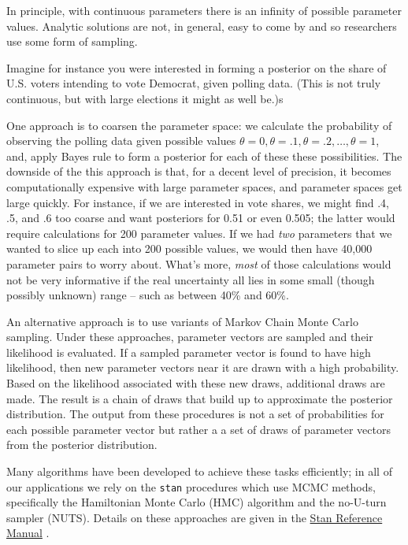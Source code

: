 \documentclass[
  12pt,
]{book}
\begin{document}
In principle, with continuous parameters there is an infinity of possible parameter values. Analytic solutions are not, in general, easy to come by and so researchers use some form of sampling.

Imagine for instance you were interested in forming a posterior on the share of U.S. voters intending to vote Democrat, given polling data. (This is not truly continuous, but with large elections it might as well be.)s

One approach is to coarsen the parameter space: we calculate the probability of observing the polling data given possible values \(\theta = 0, \theta = .1, \theta = .2, \dots, \theta = 1\), and, apply Bayes rule to form a posterior for each of these these possibilities. The downside of the this approach is that, for a decent level of precision, it becomes computationally expensive with large parameter spaces, and parameter spaces get large quickly. For instance, if we are interested in vote shares, we might find .4, .5, and .6 too coarse and want posteriors for 0.51 or even 0.505; the latter would require calculations for 200 parameter values. If we had \emph{two} parameters that we wanted to slice up each into 200 possible values, we would then have 40,000 parameter pairs to worry about. What's more, \emph{most} of those calculations would not be very informative if the real uncertainty all lies in some small (though possibly unknown) range -- such as between 40\% and 60\%.

An alternative approach is to use variants of Markov Chain Monte Carlo sampling. Under these approaches, parameter vectors are sampled and their likelihood is evaluated. If a sampled parameter vector is found to have high likelihood, then new parameter vectors near it are drawn with a high probability. Based on the likelihood associated with these new draws, additional draws are made. The result is a chain of draws that build up to approximate the posterior distribution. The output from these procedures is not a set of probabilities for each possible parameter vector but rather a a set of draws of parameter vectors from the posterior distribution.

Many algorithms have been developed to achieve these tasks efficiently; in all of our applications we rely on the \texttt{stan} procedures which use MCMC methods, specifically the Hamiltonian Monte Carlo (HMC) algorithm and the no-U-turn sampler (NUTS). Details on these approaches are given in the \href{https://mc-stan.org/docs/2_18/reference-manual/hmc-chapter.html}{Stan Reference Manual} \citep{stan2020stan}.
\end{document}
